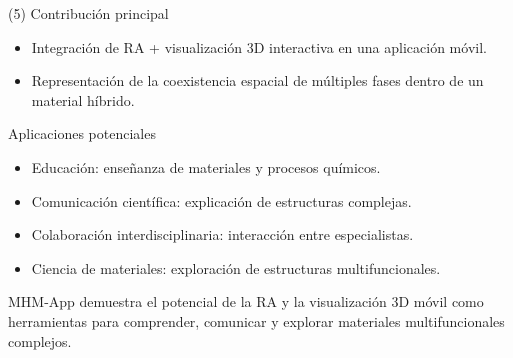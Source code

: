\begin{frame}{\citetitle{\EntradaBibtex} (5)}
Contribución principal
\begin{itemize}
\item Integración de RA + visualización 3D interactiva en una aplicación móvil.
\item Representación de la coexistencia espacial de múltiples fases dentro de un material híbrido.
\end{itemize}

Aplicaciones potenciales
\begin{itemize}
\item Educación: enseñanza de materiales y procesos químicos.
\item Comunicación científica: explicación de estructuras complejas.
\item Colaboración interdisciplinaria: interacción entre especialistas.
\item Ciencia de materiales: exploración de estructuras multifuncionales.
\end{itemize}
MHM-App demuestra el potencial de la RA y la visualización 3D móvil como herramientas para comprender, comunicar y explorar materiales multifuncionales complejos.
\end{frame}

